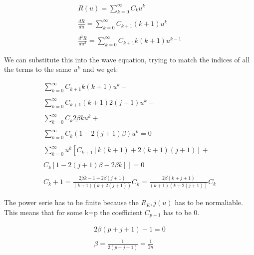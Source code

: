 \begin{equation}
  \begin{array}{c}
    R(u) = \sum_{k=0}^{\infty} C_k u^k
    \\

    \\
    \frac{dR}{du} = \sum_{k=0}^{\infty} C_{k+1} (k+1) u^{k}
    \\

    \\
    \frac{d^2R}{du^2} = \sum_{k=0}^{\infty} C_{k+1} k(k+1) u^{k-1}
  \end{array}
\end{equation}

We can substitute this into the wave equation, trying to match the indices of all the terms to the same $u^{k}$ and we get:

\begin{equation}
  \begin{array}{c}
    \sum_{k=0}^{\infty} C_{k+1} k (k+1) u^k +
    \\

    \\
    \sum_{k=0}^{\infty} C_{k+1} (k+1) 2(j+1) u^k -
    \\

    \\
    \sum_{k=0}^{\infty} C_{k} 2\beta k u^k +
    \\

    \\
    \sum_{k=0}^{\infty} C_{k} (1-2(j+1)\beta) u^k = 0
    \\

    \\
    \sum_{k=0}^{\infty} u^k\left[C_{k+1}\left[k(k+1)+2(k+1)(j+1)\right]+ \right.
    \\

    \\
    \left. C_k \left[ 1-2(j+1)\beta-2\beta k \right]\right] = 0
    \\

    \\
    C_k+1 =\frac{2\beta k-1+2\beta(j+1)}{(k+1)(k+2(j+1))}C_k = \frac{2\beta (k+j+1)}{(k+1)(k+2(j+1))} C_k
  \end{array}
\end{equation}

The power serie has to be finite because the $R_E,j(u)$ has to be normaliable. This means that for some k=p the coefficient $C_{p+1}$ has to be 0.

\begin{equation}
  \begin{array}{c}
    2\beta (p+j+1) -1 = 0
    \\

    \\
    \beta = \frac{1}{2(p+j+1)} = \frac{1}{2n}
  \end{array}
\end{equation}

